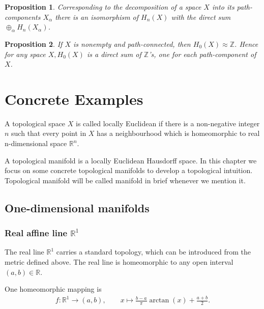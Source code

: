 \documentclass{report}
\newtheorem{proposition}{Proposition}[section]
\theoremstyle{nonumberplain}
\begin{document}
\begin{proposition}
	Corresponding to the decomposition of a space $X$ into its path-components ${X_\alpha}$ there is an isomorphism of $H_n(X)$ with the direct sum $\oplus_\alpha H_n\left(X_\alpha\right)$.
\end{proposition}

\begin{proposition}
 If $X$ is nonempty and path-connected, then $H_0(X) \approx \mathbb{Z}$. Hence for any space $X, H_0(X)$ is a direct sum of $\mathbb{Z}$'s, one for each path-component of $X$.
\end{proposition}

\chapter{Concrete Examples}
A topological space $X$ is called locally Euclidean if there is a non-negative integer $n$ such that every point in $X$ has a neighbourhood which is homeomorphic to real n-dimensional space $\mathbb{R}^n$.

\indent A topological manifold is a locally Euclidean Hausdorff space. In this chapter we focus on some concrete topological manifolds to develop a topological intuition. Topological manifold will be called manifold in brief whenever we mention it.

\section{One-dimensional manifolds}
\subsection{Real affine line $\mathbb{R}^1$}
The real line $\mathbb{R}^1$ carries a standard topology, which can be introduced from the metric defined above. The real line is homeomorphic to any open interval $(a, b)\in\mathbb{R}$.
\begin{center}
\end{center}
One homeomorphic mapping is
\begin{align*}
	f:\mathbb{R}^1\longrightarrow(a, b),\qquad
	x\longmapsto \frac{b-a}{\pi}\arctan\left(x\right)+\frac{a+b}{2}.
\end{align*}
\end{document}
